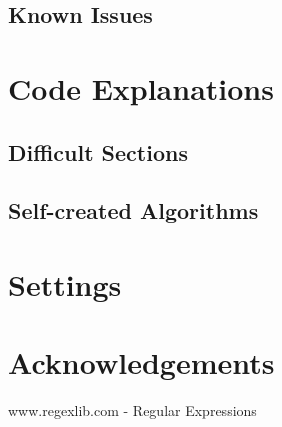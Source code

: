 \subsection{Known Issues}

\section{Code Explanations}

\subsection{Difficult Sections}

\subsection{Self-created Algorithms}

\section{Settings}

\section{Acknowledgements}

www.regexlib.com - Regular Expressions

